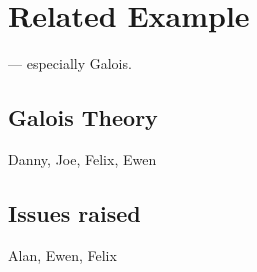 \section{Related Example}
\label{galois}


--- especially Galois.

\subsection{Galois Theory}

Danny, Joe, Felix, Ewen

\subsection{Issues raised}

Alan, Ewen, Felix

